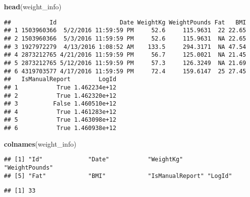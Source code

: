 \documentclass[
]{article}
\newenvironment{Shaded}{\begin{snugshade}}{\end{snugshade}}
\newcommand{\FunctionTok}[1]{\textcolor[rgb]{0.13,0.29,0.53}{\textbf{#1}}}
\newcommand{\NormalTok}[1]{#1}
\newcommand{\SpecialCharTok}[1]{\textcolor[rgb]{0.81,0.36,0.00}{\textbf{#1}}}
\begin{document}
\begin{Shaded}
\begin{Highlighting}[]
\FunctionTok{head}\NormalTok{(weight\_info)}
\end{Highlighting}
\end{Shaded}

\begin{verbatim}
##           Id                  Date WeightKg WeightPounds Fat   BMI
## 1 1503960366  5/2/2016 11:59:59 PM     52.6     115.9631  22 22.65
## 2 1503960366  5/3/2016 11:59:59 PM     52.6     115.9631  NA 22.65
## 3 1927972279  4/13/2016 1:08:52 AM    133.5     294.3171  NA 47.54
## 4 2873212765 4/21/2016 11:59:59 PM     56.7     125.0021  NA 21.45
## 5 2873212765 5/12/2016 11:59:59 PM     57.3     126.3249  NA 21.69
## 6 4319703577 4/17/2016 11:59:59 PM     72.4     159.6147  25 27.45
##   IsManualReport        LogId
## 1           True 1.462234e+12
## 2           True 1.462320e+12
## 3          False 1.460510e+12
## 4           True 1.461283e+12
## 5           True 1.463098e+12
## 6           True 1.460938e+12
\end{verbatim}

\begin{Shaded}
\begin{Highlighting}[]
\FunctionTok{colnames}\NormalTok{(weight\_info)}
\end{Highlighting}
\end{Shaded}

\begin{verbatim}
## [1] "Id"             "Date"           "WeightKg"       "WeightPounds"  
## [5] "Fat"            "BMI"            "IsManualReport" "LogId"
\end{verbatim}

\begin{Shaded}
\end{Shaded}

\begin{verbatim}
## [1] 33
\end{verbatim}

\begin{Shaded}
\end{Shaded}
\end{document}
